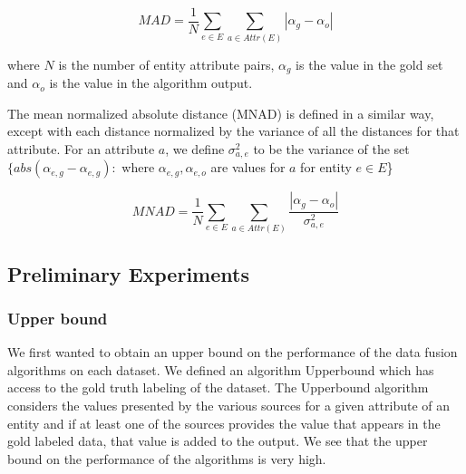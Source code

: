 \documentclass{acm_proc_article-sp}
\begin{document}
\begin{equation}
MAD = \frac{1}{N} \sum_{e \in E} \sum_{a \in Attr(E)} | \alpha_g - \alpha_o |
\end{equation}

where $N$ is the number of entity attribute pairs, $\alpha_g$ is the value in the gold set and $\alpha_o$ is the value in the algorithm output. 

The mean normalized absolute distance (MNAD) is defined in a similar way, except with each distance normalized by the variance of all the distances for that attribute. For an attribute $a$, we define $\sigma^2_{a,e}$ to be the variance of the set $\{ abs(\alpha_{e,g}-\alpha_{e,g})   :  $ where $\alpha_{e,g}, \alpha_{e,o}$ are values for  $a$ for entity $e \in E$\} 

\begin{equation}
MNAD = \frac{1}{N} \sum_{e \in E} \sum_{a \in Attr(E)} \frac{| \alpha_g - \alpha_o |}{\sigma^2_{a,e}}
\end{equation}


\newcommand{\headcol}{\rowcolor{tableheadcolor}} %



\subsection{Preliminary Experiments}

\subsubsection{Upper bound}

We first wanted to obtain an upper bound on the performance of the data fusion algorithms on each dataset. We defined an algorithm {\sc Upperbound} which has access to the gold truth labeling of the dataset. The {\sc Upperbound} algorithm considers the values presented by the various sources for a given attribute of an entity and if at least one of the sources provides the value that appears in the gold labeled data, that value is added to the output. We see that the upper bound on the performance of the algorithms is very high. 
\end{document}
